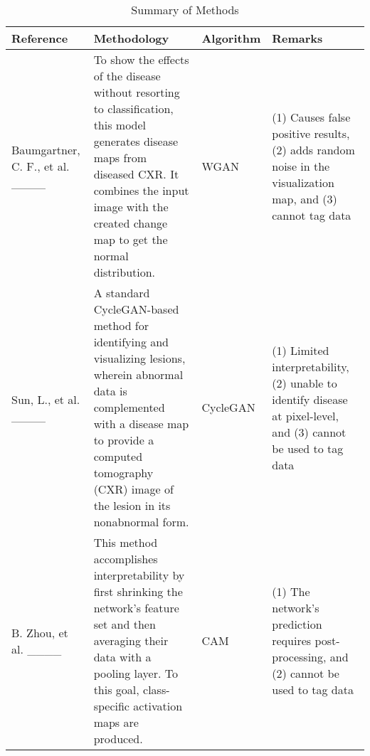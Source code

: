 {\begin{table}[h!]
\centering
\caption{\label{tab:example1}Summary of Methods}
\bigskip
\begin{tabular}{| p{2cm}|p{4cm}|p{2cm}|p{4cm}|}
\hline
\textbf{Reference} & \textbf{Methodology} & \textbf{Algorithm} & \textbf{Remarks} \\
\hline
Baumgartner, C. F., et al. ____ & To show the effects of the disease without resorting to classification, this model generates disease maps from diseased CXR. It combines the input image with the created change map to get the normal distribution. & WGAN & (1) Causes false positive results, (2) adds random noise in the visualization map, and (3) cannot tag data \\
\hline
Sun, L., et al. ____ & A standard CycleGAN-based method for identifying and visualizing lesions, wherein abnormal data is complemented with a disease map to provide a computed tomography (CXR) image of the lesion in its nonabnormal form. & CycleGAN & (1) Limited interpretability, (2) unable to identify disease at pixel-level, and (3) cannot be used to tag data  \\
\hline
B. Zhou, et al. ____ & This method accomplishes interpretability by first shrinking the network's feature set and then averaging their data with a pooling layer. To this goal, class-specific activation maps are produced. & CAM & (1) The network's prediction requires post-processing, and (2) cannot be used to tag data\\
\hline
\end{tabular}

\end{table}
}